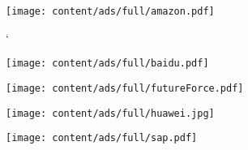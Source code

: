 \thispagestyle{empty}
\begin{center}
  \vfill
  \texttt{[image: content/ads/full/amazon.pdf]}
  \vfill
\end{center}
\clearpage
`
\thispagestyle{empty}
\begin{center}
  \vfill
  \texttt{[image: content/ads/full/baidu.pdf]}
  \vfill
\end{center}
\clearpage


\thispagestyle{empty}
\begin{center}
  \vfill
  \texttt{[image: content/ads/full/futureForce.pdf]}
  \vfill
\end{center}

\thispagestyle{empty}
\begin{center}
  \vfill
  \texttt{[image: content/ads/full/huawei.jpg]}
  \vfill
\end{center}

\thispagestyle{empty}
\begin{center}
  \vfill
  \texttt{[image: content/ads/full/sap.pdf]}
  \vfill
\end{center}

\clearpage
